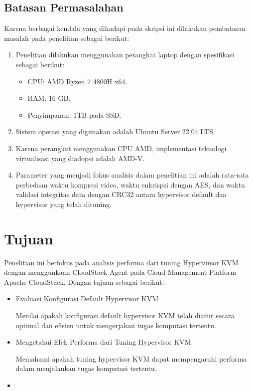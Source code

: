 \subsection{Batasan Permasalahan}
Karena berbagai kendala yang dihadapi pada skripsi ini dilakukan pembatasan masalah pada penelitian  sebagai berikut:
\begin{enumerate}
      \item Penelitian dilakukan menggunakan perangkat laptop dengan spesifikasi sebagai berikut:
            \begin{itemize}
                  \item CPU: AMD Ryzen 7 4800H x64.
                  \item RAM: 16 GB.
                  \item Penyimpanan: 1TB pada SSD.
            \end{itemize}
      \item Sistem operasi yang digunakan adalah Ubuntu Server 22.04 LTS.
      \item Karena perangkat menggunakan CPU AMD, implementasi teknologi virtualisasi yang diadopsi adalah AMD-V.
      \item Parameter yang menjadi fokus analisis dalam penelitian ini adalah rata-rata perbedaan waktu kompresi video, waktu enkrispsi dengan AES, dan waktu validasi integritas data dengan CRC32 antara hypervisor default dan hypervisor yang telah dituning.
\end{enumerate}


\section{Tujuan}
Penelitian ini berfokus pada analisis performa dari tuning Hypervirsor KVM dengan menggunkaan CloudStack Agent pada \f{Cloud Management Platform} Apache CloudStack. Dengan tujuan sebagai berikut:

\begin{itemize}
      \item Evaluasi Konfigurasi Default Hypervisor KVM

            Menilai apakah konfigurasi default hypervisor KVM telah diatur secara optimal dan efisien untuk mengerjakan tugas komputasi tertentu.

      \item Mengetahui Efek Performa dari Tuning Hypervisor KVM

            Memahami apakah tuning hypervisor KVM dapat mempengaruhi performa dalam menjalankan tugas komputasi tertentu.

      \item 
\end{itemize}

